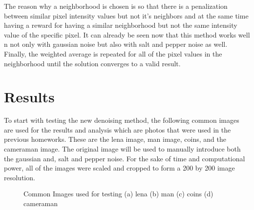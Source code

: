 \documentclass[conference]{IEEEtran}
\begin{document}
The reason why a neighborhood is chosen is so that there is a penalization between similar pixel intensity values but not it's neighbors and at the same time
having a reward for having a similar neighborhood but not the same intensity value of the specific pixel. It can already be seen now that this method works well n
not only with gaussian noise but also with salt and pepper noise as well.
Finally, the weighted average is repeated for all of the pixel values in the neighborhood until the solution converges to a valid result.

\section{Results}

    To start with testing the new denoising method, the following common images are used for the results and analysis which are photos that were used in the previous homeworks.
    These are the lena image, man image, coins, and the cameraman image. The original image will be used to manually introduce both the gaussian and, salt and pepper noise.
    For the sake of time and computational power, all of the images were scaled and cropped to form a 200 by 200 image resolution.

    \begin{figure}[htbp]
        \centering
        \caption{Common Images used for testing (a) lena (b) man (c) coins (d) cameraman}
    \end{figure}
\end{document}
